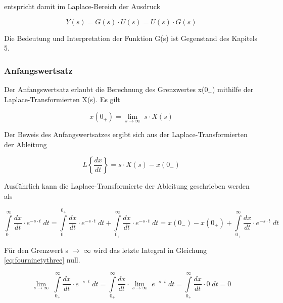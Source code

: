 \noindent entspricht damit im Laplace-Bereich der Ausdruck

\begin{equation}\label{eq:fourninety}
Y\left(s\right)=G\left(s\right)\cdot U\left(s\right)=U\left(s\right)\cdot G\left(s\right)
\end{equation}

\noindent Die Bedeutung und Interpretation der Funktion G(s) ist Gegenstand des Kapitels 5.

\subsubsection{Anfangswertsatz}

\noindent Der Anfangswertsatz erlaubt die Berechnung des Grenzwertes x(0$_{+}$) mithilfe der Laplace-Transformierten X(s). Es gilt

\begin{equation}\label{eq:fourninetyone}
x\left(0_{+} \right)=\lim\limits_{s\to \infty }\; s\cdot X\left(s\right)
\end{equation}

\noindent Der Beweis des Anfangswertsatzes ergibt sich aus der Laplace-Transformierten der Ableitung

\begin{equation}\label{eq:fourninetytwo}
L\left\{\frac{dx}{dt} \right\}=s\cdot X\left(s\right)-x\left(0_{-} \right)
\end{equation}

\noindent Ausführlich kann die Laplace-Transformierte der Ableitung geschrieben werden als 

\begin{equation}\label{eq:fourninetythree}
\int\limits _{0_{-} }^{\infty }\frac{dx}{dt}  \cdot e^{-s\cdot t}\;dt=\int\limits _{0_{-} }^{0_{+} }\frac{dx}{dt}  \cdot e^{-s\cdot t} \;dt+\int\limits _{0_{+} }^{\infty }\frac{dx}{dt}  \cdot e^{-s\cdot t} \;dt=x\left(0_{-} \right)-x\left(0_{+} \right)+\int\limits _{0_{+} }^{\infty }\frac{dx}{dt}  \cdot e^{-s\cdot t} \;dt
\end{equation}

\noindent Für den Grenzwert s $\rightarrow$ $\mathrm{\infty}$ wird das letzte Integral in Gleichung \eqref{eq:fourninetythree} null. 

\begin{equation}\label{eq:fourninetyfour}
\lim\limits_{s\to \infty } \, \, \int\limits _{0_{+} }^{\infty }\frac{dx}{dt}  \cdot e^{-s\cdot t} \; dt=\int\limits _{0_{+} }^{\infty }\frac{dx}{dt}  \cdot \lim\limits_{s\to \infty } \, \, e^{-s\cdot t} \;dt=\int\limits _{0_{+} }^{\infty }\frac{dx}{dt}  \cdot 0\;dt=0
\end{equation}

